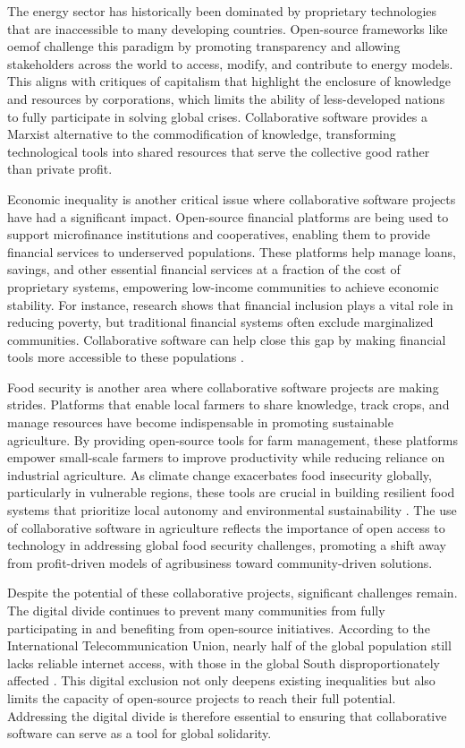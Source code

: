 \begin{refsection}
The energy sector has historically been dominated by proprietary technologies that are inaccessible to many developing countries. Open-source frameworks like oemof challenge this paradigm by promoting transparency and allowing stakeholders across the world to access, modify, and contribute to energy models. This aligns with critiques of capitalism that highlight the enclosure of knowledge and resources by corporations, which limits the ability of less-developed nations to fully participate in solving global crises. Collaborative software provides a Marxist alternative to the commodification of knowledge, transforming technological tools into shared resources that serve the collective good rather than private profit.

Economic inequality is another critical issue where collaborative software projects have had a significant impact. Open-source financial platforms are being used to support microfinance institutions and cooperatives, enabling them to provide financial services to underserved populations. These platforms help manage loans, savings, and other essential financial services at a fraction of the cost of proprietary systems, empowering low-income communities to achieve economic stability. For instance, research shows that financial inclusion plays a vital role in reducing poverty, but traditional financial systems often exclude marginalized communities. Collaborative software can help close this gap by making financial tools more accessible to these populations \cite[pp.~210-213]{internationaltelecomstats}.

Food security is another area where collaborative software projects are making strides. Platforms that enable local farmers to share knowledge, track crops, and manage resources have become indispensable in promoting sustainable agriculture. By providing open-source tools for farm management, these platforms empower small-scale farmers to improve productivity while reducing reliance on industrial agriculture. As climate change exacerbates food insecurity globally, particularly in vulnerable regions, these tools are crucial in building resilient food systems that prioritize local autonomy and environmental sustainability \cite[pp.~33-36]{pearceopensourceagriculture}. The use of collaborative software in agriculture reflects the importance of open access to technology in addressing global food security challenges, promoting a shift away from profit-driven models of agribusiness toward community-driven solutions.

Despite the potential of these collaborative projects, significant challenges remain. The digital divide continues to prevent many communities from fully participating in and benefiting from open-source initiatives. According to the International Telecommunication Union, nearly half of the global population still lacks reliable internet access, with those in the global South disproportionately affected \cite[pp.~210-213]{internationaltelecomstats}. This digital exclusion not only deepens existing inequalities but also limits the capacity of open-source projects to reach their full potential. Addressing the digital divide is therefore essential to ensuring that collaborative software can serve as a tool for global solidarity.


\end{refsection}
